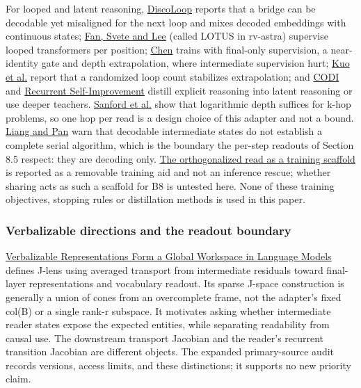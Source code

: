 For looped and latent reasoning, \href{https://arxiv.org/abs/2607.00341}{DiscoLoop} reports that a bridge can be decodable yet misaligned for the next loop and mixes
decoded embeddings with continuous states; \href{https://arxiv.org/abs/2606.31779}{Fan, Svete and Lee} (called LOTUS in rv-astra) supervise looped transformers per position;
\href{https://arxiv.org/abs/2603.21676}{Chen} trains with final-only supervision, a near-identity gate and depth extrapolation, where intermediate supervision hurt;
\href{https://arxiv.org/abs/2606.29983}{Kuo et al.} report that a randomized loop count stabilizes extrapolation; and
\href{https://arxiv.org/abs/2502.21074}{CODI} and \href{https://arxiv.org/abs/2610.10623}{Recurrent Self-Improvement} distill explicit reasoning into latent reasoning or
use deeper teachers. \href{https://arxiv.org/abs/2402.09268}{Sanford et al.} show that logarithmic depth suffices for k-hop problems, so one hop per read is a design
choice of this adapter and not a bound. \href{https://arxiv.org/abs/2602.00449}{Liang and Pan} warn that decodable intermediate states do not establish a complete serial
algorithm, which is the boundary the per-step readouts of Section 8.5 respect: they are decoding only. \href{https://arxiv.org/abs/2607.19390}{The orthogonalized read as a training scaffold}  %
is reported as a removable training aid and not an inference rescue; whether sharing acts as such a scaffold for B8 is untested here. None of these
training objectives, stopping rules or distillation methods is used in this paper.

\subsubsection*{Verbalizable directions and the readout boundary}

\href{https://transformer-circuits.pub/2026/workspace/index.html}{Verbalizable Representations Form a Global Workspace in Language Models}
defines J-lens using averaged transport from intermediate residuals toward final-layer
representations and vocabulary readout. Its sparse J-space construction is generally
a union of cones from an overcomplete frame, not the adapter’s fixed col(B) or a single
rank-r subspace. It motivates asking whether intermediate reader states expose the
expected entities, while separating readability from causal use. The downstream
transport Jacobian and the reader’s recurrent transition Jacobian are different
objects. The expanded primary-source audit
records versions, access limits, and these distinctions; it supports no new priority claim.


